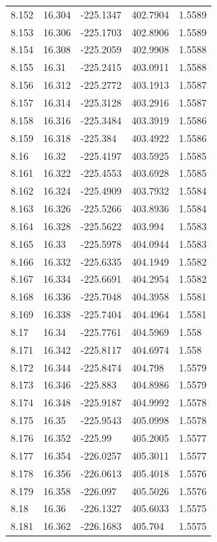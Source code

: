\begin{tabular}{lllll}
8.152 & 16.304 & -225.1347 & 402.7904 & 1.5589 \\
8.153 & 16.306 & -225.1703 & 402.8906 & 1.5589 \\
8.154 & 16.308 & -225.2059 & 402.9908 & 1.5588 \\
8.155 & 16.31 & -225.2415 & 403.0911 & 1.5588 \\
8.156 & 16.312 & -225.2772 & 403.1913 & 1.5587 \\
8.157 & 16.314 & -225.3128 & 403.2916 & 1.5587 \\
8.158 & 16.316 & -225.3484 & 403.3919 & 1.5586 \\
8.159 & 16.318 & -225.384 & 403.4922 & 1.5586 \\
8.16 & 16.32 & -225.4197 & 403.5925 & 1.5585 \\
8.161 & 16.322 & -225.4553 & 403.6928 & 1.5585 \\
8.162 & 16.324 & -225.4909 & 403.7932 & 1.5584 \\
8.163 & 16.326 & -225.5266 & 403.8936 & 1.5584 \\
8.164 & 16.328 & -225.5622 & 403.994 & 1.5583 \\
8.165 & 16.33 & -225.5978 & 404.0944 & 1.5583 \\
8.166 & 16.332 & -225.6335 & 404.1949 & 1.5582 \\
8.167 & 16.334 & -225.6691 & 404.2954 & 1.5582 \\
8.168 & 16.336 & -225.7048 & 404.3958 & 1.5581 \\
8.169 & 16.338 & -225.7404 & 404.4964 & 1.5581 \\
8.17 & 16.34 & -225.7761 & 404.5969 & 1.558 \\
8.171 & 16.342 & -225.8117 & 404.6974 & 1.558 \\
8.172 & 16.344 & -225.8474 & 404.798 & 1.5579 \\
8.173 & 16.346 & -225.883 & 404.8986 & 1.5579 \\
8.174 & 16.348 & -225.9187 & 404.9992 & 1.5578 \\
8.175 & 16.35 & -225.9543 & 405.0998 & 1.5578 \\
8.176 & 16.352 & -225.99 & 405.2005 & 1.5577 \\
8.177 & 16.354 & -226.0257 & 405.3011 & 1.5577 \\
8.178 & 16.356 & -226.0613 & 405.4018 & 1.5576 \\
8.179 & 16.358 & -226.097 & 405.5026 & 1.5576 \\
8.18 & 16.36 & -226.1327 & 405.6033 & 1.5575 \\
8.181 & 16.362 & -226.1683 & 405.704 & 1.5575 \\

\end{tabular}
